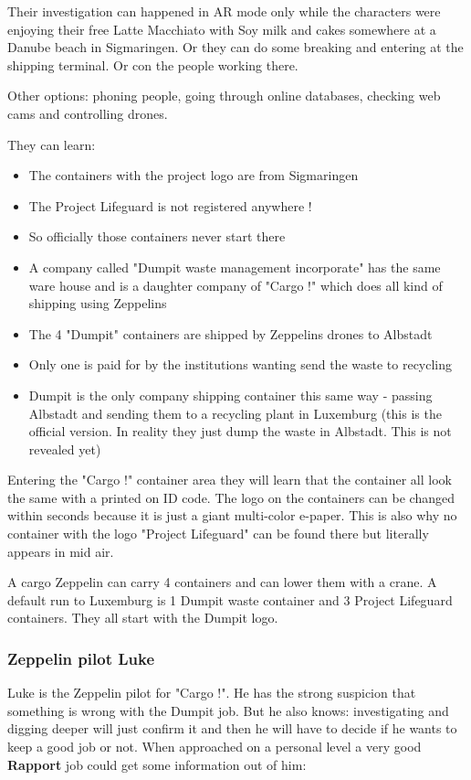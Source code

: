Their investigation can happened in AR mode only while the characters were enjoying their free Latte Macchiato with Soy milk and cakes somewhere at a Danube beach in Sigmaringen. Or they can do some breaking and entering at the shipping terminal. Or con the people working there.

Other options: phoning people, going through online databases, checking web cams and controlling drones.

They can learn:

\begin{itemize}
    \item The containers with the project logo are from Sigmaringen
    \item The Project Lifeguard is not registered anywhere !
    \item So officially those containers never start there
    \item A company called "Dumpit waste management incorporate" has the same ware house and is a daughter company of "Cargo !" which does all kind of shipping using Zeppelins
    \item The 4 "Dumpit" containers are shipped by Zeppelins drones to Albstadt
    \item Only one is paid for by the institutions wanting send the waste to recycling
    \item Dumpit is the only company shipping container this same way - passing Albstadt and sending them to a recycling plant in Luxemburg (this is the official version. In reality they just dump the waste in Albstadt. This is not revealed yet)
\end{itemize}

Entering the "Cargo !" container area they will learn that the container all look the same with a printed on ID code. The logo on the containers can be changed within seconds because it is just a giant multi-color e-paper. This is also why no container with the logo "Project Lifeguard" can be found there but literally appears in mid air.

A cargo Zeppelin can carry 4 containers and can lower them with a crane. A default run to Luxemburg is 1 Dumpit waste container and 3 Project Lifeguard containers. They all start with the Dumpit logo.

\subsubsection{Zeppelin pilot Luke}

Luke is the Zeppelin pilot for "Cargo !". He has the strong suspicion that something is wrong with the Dumpit job. But he also knows: investigating and digging deeper will just confirm it and then he will have to decide if he wants to keep a good job or not. When approached on a personal level a very good \textbf{Rapport} job could get some information out of him:

